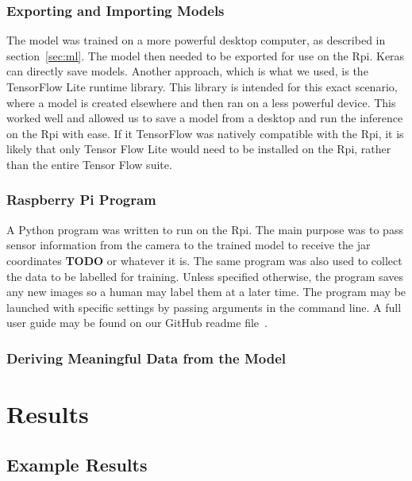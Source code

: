\documentclass[11pt]{article}
\begin{document}
            \subsubsection{Exporting and Importing Models}
                The model was trained on a more powerful desktop computer, as described in section~\ref{sec:ml}. The model then needed to be exported for use on the Rpi. Keras can directly save models. Another approach, which is what we used, is the TensorFlow Lite runtime library. This library is intended for this exact scenario, where a model is created elsewhere and then ran on a less powerful device. This worked well and allowed us to save a model from a desktop and run the inference on the Rpi with ease. If it TensorFlow was natively compatible with the Rpi, it is likely that only Tensor Flow Lite would need to be installed on the Rpi, rather than the entire Tensor Flow suite.

            \subsubsection{Raspberry Pi Program}
                A Python program was written to run on the Rpi. The main purpose was to pass sensor information from the camera to the trained model to receive the jar coordinates \textbf{TODO} or whatever it is. The same program was also used to collect the data to be labelled for training. Unless specified otherwise, the program saves any new images so a human may label them at a later time. The program may be launched with specific settings by passing arguments in the command line. A full user guide may be found on our GitHub readme file~\cite{akkerman_hunter}.

            \subsubsection{Deriving Meaningful Data from the Model}

    \FloatBarrier
    \section{Results}
        \subsection{Example Results}
\end{document}
